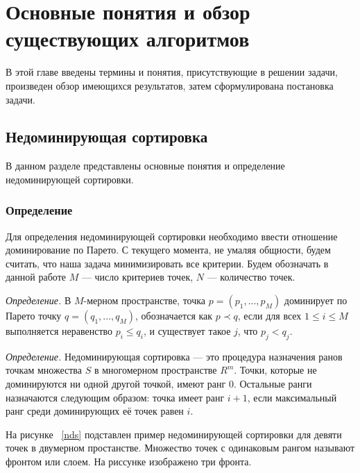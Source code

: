 
\chapter{Основные понятия и обзор существующих алгоритмов}
\label{chapter1}

В этой главе введены термины и понятия, присутствующие в решении задачи, произведен обзор имеющихся результатов, затем сформулирована постановка задачи.

\section{Недоминирующая сортировка}

В данном разделе представлены основные понятия и определение недоминирующей сортировки. 

\subsection{Определение}

Для определения недоминирующей сортировки необходимо ввести отношение доминирование по Парето. С текущего момента, не умаляя общности, будем считать, что наша задача минимизировать все критерии. Будем обозначать в данной работе $M$ {---} число критериев точек, $N$ {---} количество точек.

\textit{Определение.} В $M$-мерном пространстве, точка $p = (p_1,...,p_M)$ доминирует по Парето точку $q = (q_1,...,q_M)$, обозначается как $p \prec q$, если для всех $1 \leq i \leq M$ выполняется неравенство $p_i\leq q_i$, и существует такое $j$, что $p_j < q_j$.

\textit{Определение.} Недоминирующая сортировка {---} это процедура назначения ранов точкам множества $S$ в многомерном пространстве $R^m$. Точки, которые не доминируются ни одной другой точкой, имеют ранг $0$. Остальные ранги назначаются следующим образом: точка имеет ранг $i + 1$, если максимальный ранг среди
доминирующих её точек равен $i$.

На рисунке ~\ref{nds} подставлен пример недоминирующей сортировки для девяти точек в двумерном простанстве. Множество точек с одинаковым рангом называют фронтом или слоем. На риссунке изображено три фронта. 

